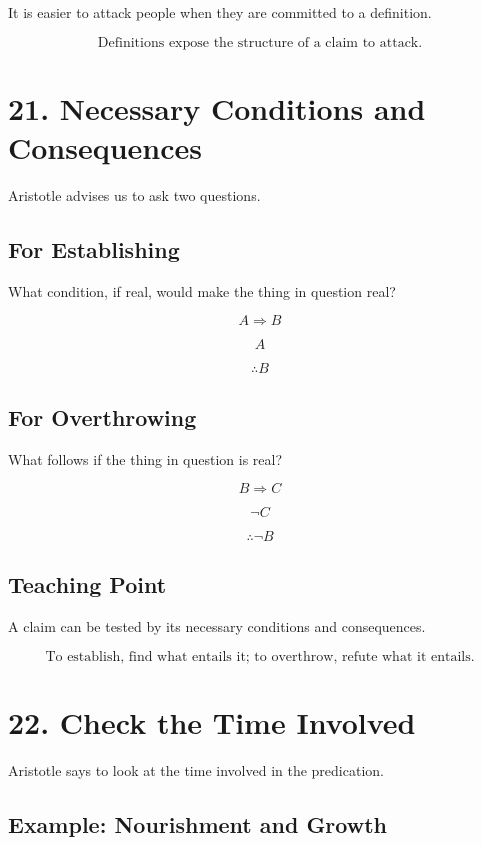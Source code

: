 \documentclass[12pt]{article}
\begin{document}
It is easier to attack people when they are committed to a definition.

\[
\boxed{
\text{Definitions expose the structure of a claim to attack.}
}
\]

\section*{21. Necessary Conditions and Consequences}

Aristotle advises us to ask two questions.

\subsection*{For Establishing}

What condition, if real, would make the thing in question real?

\[
A \Rightarrow B
\]

\[
A
\]

\[
\therefore B
\]

\subsection*{For Overthrowing}

What follows if the thing in question is real?

\[
B \Rightarrow C
\]

\[
\neg C
\]

\[
\therefore \neg B
\]

\subsection*{Teaching Point}

A claim can be tested by its necessary conditions and consequences.

\[
\boxed{
\text{To establish, find what entails it; to overthrow, refute what it entails.}
}
\]

\section*{22. Check the Time Involved}

Aristotle says to look at the time involved in the predication.

\subsection*{Example: Nourishment and Growth}
\end{document}
